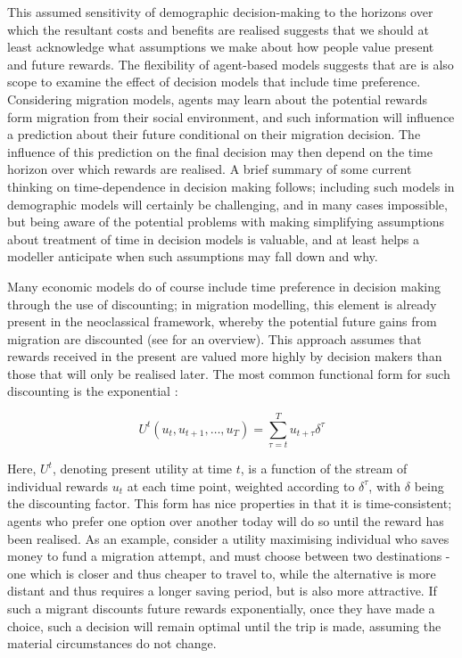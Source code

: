 \documentclass{article}
\begin{document}
This assumed sensitivity of demographic decision-making to the horizons over which the resultant costs and benefits are realised suggests that we should at least acknowledge what assumptions we make about how people value present and future rewards. The flexibility of agent-based models suggests that are is also scope to examine the effect of decision models that include time preference. Considering migration models, agents may learn about the potential rewards form migration from their social environment, and such information will influence a prediction about their future conditional on their migration decision. The influence of this prediction on the final decision may then depend on the time horizon over which rewards are realised.  A brief summary of some current thinking on time-dependence in decision making follows; including such models in demographic models will certainly be challenging, and in many cases impossible, but being aware of the potential problems with making simplifying assumptions about treatment of time in decision models is valuable, and at least helps a modeller anticipate when such assumptions may fall down and why.

Many economic models do of course include time preference in decision making through the use of discounting; in migration modelling, this element is already present in the neoclassical framework, whereby the potential future gains from migration are discounted (see \citet{Massey1993} for an overview). This approach assumes that rewards received in the present are valued more highly by decision makers than those that will only be realised later. The most common functional form for such discounting is the exponential \citep{ODonoghue2000}:

\[
U^{t}(u_t, u_{t+1},\dots,u_T ) = \sum_{\tau=t}^{T} u_{t+\tau}\delta^{\tau}
\]

Here, \(U^t\), denoting present utility at time \(t\), is a function of the stream of individual rewards \(u_t\) at each time point, weighted  according to \(\delta^{\tau}\), with \(\delta\) being the discounting factor. This form has nice properties in that it is time-consistent; agents who prefer one option over another today will do so until the reward has been realised. As an example, consider a utility maximising individual who saves money to fund a migration attempt, and must choose between two destinations - one which is closer and thus cheaper to travel to, while the alternative is more distant and thus requires a longer saving period, but is also more attractive. If such a migrant discounts future rewards exponentially, once they have made a choice, such a decision will remain optimal until the trip is made, assuming the material circumstances do not change.
\end{document}
